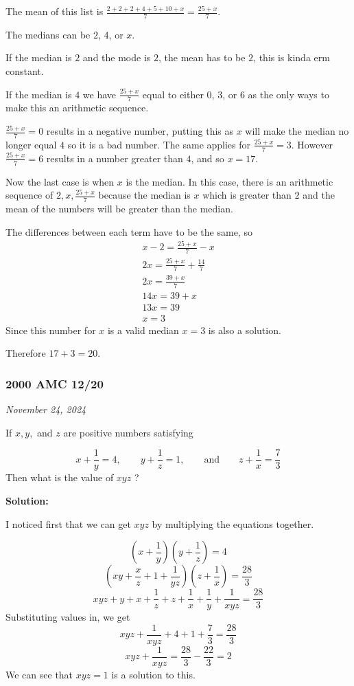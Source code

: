\documentclass[../mathproblems.tex]{subfiles}
\begin{document}
The mean of this list is $\frac{2+2+2+4+5+10+x}{7} = \frac{25+x}{7}$.

The medians can be $2$, $4$, or $x$.

If the median is $2$ and the mode is $2$, the mean has to be $2$, this is kinda erm constant.

If the median is $4$ we have $\frac{25+x}{7}$ equal to either $0$, $3$, or $6$ as the only ways to make this an arithmetic sequence.

$\frac{25+x}{7} = 0$ results in a negative number, putting this as $x$ will make the median no longer equal $4$ so it is a bad number. The same applies for $\frac{25+x}{7} = 3$. However $\frac{25+x}{7}=6$ results in a number greater than $4$, and so $x=17$.

Now the last case is when $x$ is the median. In this case, there is an arithmetic sequence of $2,x,\frac{25+x}{7}$ because the median is $x$ which is greater than $2$ and the mean of the numbers will be greater than the median.

The differences between each term have to be the same, so
\begin{align*} x-2 = \frac{25+x}{7}-x\\ 2x = \frac{25+x}{7}+\frac{14}{7}\\ 2x = \frac{39+x}{7}\\ 14x = 39+x\\ 13x = 39 \\ x = 3 \end{align*}
Since this number for $x$ is a valid median $x=3$ is also a solution.

Therefore $17+3 = \boxed{20}$.

\noindent\hrulefill
\subsubsection*{2000 AMC 12/20} 
\textit{November 24, 2024}

If $x,y,$ and $z$ are positive numbers satisfying

\[x + \frac{1}{y} = 4,\qquad y + \frac{1}{z} = 1, \qquad \text{and} \qquad z + \frac{1}{x} = \frac{7}{3}\]
Then what is the value of $xyz$ ?

\textbf{Solution:}

I noticed first that we can get $xyz$ by multiplying the equations together.

\[ \left(x+\frac{1}{y}\right) \left(y+\frac{1}{z}\right) = 4 \]\[ \left(xy + \frac{x}{z}+1+\frac{1}{yz}\right)\left(z+\frac{1}{x}\right) = \frac{28}{3} \]\[ xyz + y + x + \frac{1}{z} + z + \frac{1}{x} + \frac{1}{y} + \frac{1}{xyz} = \frac{28}{3} \]
Substituting values in, we get
\[ xyz + \frac{1}{xyz} + 4 + 1 + \frac{7}{3} = \frac{28}{3} \]\[ xyz + \frac{1}{xyz} = \frac{28}{3} - \frac{22}{3} = 2 \]
We can see that $\boxed{xyz=1}$ is a solution to this.
\end{document}
